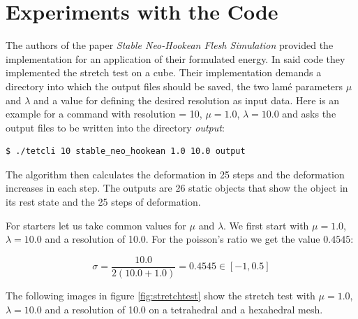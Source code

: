 \section{Experiments with the Code}
The authors of the paper \textit{Stable Neo-Hookean Flesh Simulation} \cite{Smith:2018:SNF:3191713.3180491} provided the implementation for an application of their formulated energy. In said code they implemented the stretch test on a cube. Their implementation demands a directory into which the output files should be saved, the two lamé parameters $\mu$ and $\lambda$ and a value for defining the desired resolution as input data. Here is an example for a command with resolution = 10, $\mu=1.0$, $\lambda=10.0$ and asks the output files to be written into the directory \textit{output}:
\begin{lstlisting}[language=bash]
$ ./tetcli 10 stable_neo_hookean 1.0 10.0 output
\end{lstlisting}

The algorithm then calculates the deformation in 25 steps and the deformation increases in each step. The outputs are 26 static objects that show the object in its rest state and the 25 steps of deformation.



For starters let us take common values for $\mu$ and $\lambda$. We first start with $\mu = 1.0$, $\lambda = 10.0$ and a resolution of 10.0. For the poisson's ratio we get the value $0.4545$:

\[ \sigma =  \frac{10.0}{2 (10.0 + 1.0)} = 0.4545 \in [-1, 0.5] \]


The following images in figure \ref{fig:stretchtest} show the stretch test with $\mu = 1.0$, $\lambda = 10.0$ and a resolution of 10.0 on a tetrahedral and a hexahedral mesh.

